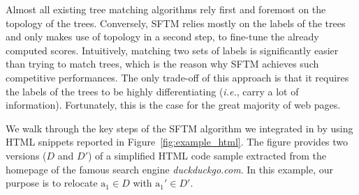 Almost all existing tree matching algorithms rely first and foremost on the topology of the trees.
Conversely, SFTM relies mostly on the labels of the trees and only makes use of topology in a second step, to fine-tune the already computed scores. Intuitively, matching two sets of labels is significantly easier than trying to match trees, which is the reason why SFTM achieves such competitive performances.
The only trade-off of this approach is that it requires the labels of the trees to be highly differentiating (\emph{i.e.}, carry a lot of information). 
Fortunately, this is the case for the great majority of web pages.

We walk through the key steps of the SFTM algorithm we integrated in \erratum{} by using HTML snippets reported in Figure~\ref{fig:example_html}.
The figure provides two versions ($D$ and $D'$) of a simplified HTML code sample extracted from the homepage of the famous search engine \textit{duckduckgo.com}.
In this example, our purpose is to relocate $\text{a}_1 \in D$ with $\text{a}_1' \in D'$.

